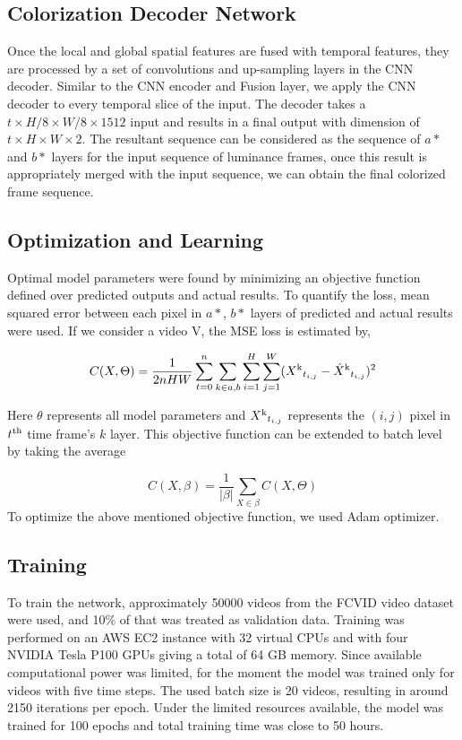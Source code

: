 \documentclass[10pt,twocolumn,letterpaper]{article}
\begin{document}
\subsection{Colorization Decoder Network}
Once the local and global spatial features are fused with temporal features, they are processed by a set of convolutions and up-sampling layers in the CNN decoder. Similar to the CNN encoder and Fusion layer, we apply the CNN decoder to every temporal slice of the input. The decoder takes a $t\times H/8\times W/8\times 1512$ input and results in a final output with dimension of $t\times H\times W\times 2$. The resultant sequence can be considered as the sequence of $a*$ and $b*$ layers for the input sequence of luminance frames, once this result is appropriately merged with the input sequence, we can obtain the final colorized frame sequence.

\subsection{Optimization and Learning}
Optimal model parameters were found by minimizing an objective function defined over predicted outputs and actual results. To quantify the loss, mean squared error between each pixel in $a*$, $b*$ layers of predicted and actual results were used. If we consider a video V, the MSE loss is estimated by,

\begin{equation}
\small
C(X,\Theta ) = \frac{1}{2nHW}\sum_{t=0}^{n}\sum_{k\in {a,b}}\sum_{i=1}^{H}\sum_{j=1}^{W} (X\textsuperscript{k}_{t_{i,j}} - \hat{X}\textsuperscript{k}_{t_{i,j}}) ^ 2
\end{equation}

Here $\theta$ represents all model parameters and $X\textsuperscript{k}_{t_{i,j}}$ represents the $(i,j)$ pixel in $t\textsuperscript{th}$ time frame's $k$ layer. This objective function can be extended to batch level by taking the average 

\begin{equation}
C(X,\beta) = \frac{1}{\left | \beta  \right |}\sum_{X\in {\beta}} C(X,\Theta)
\end{equation}
To optimize the above mentioned objective function, we used Adam optimizer. \cite{DBLP:journals/corr/KingmaB14}

\subsection{Training}
To train the network, approximately 50000 videos from the FCVID \cite{FCVID} video dataset were used, and 10\% of that was treated as validation data. Training was performed on an AWS EC2 instance with 32 virtual CPUs and with four NVIDIA Tesla P100 GPUs giving a total of 64 GB memory. 
Since available computational power was limited, for the moment the model was trained only for videos with five time steps. The used batch size is 20 videos, resulting in around 2150 iterations per epoch. Under the limited resources available, the model was trained for 100 epochs and total training time was close to 50 hours. 
\end{document}
